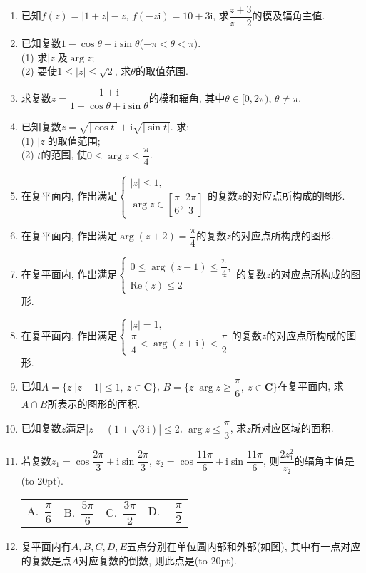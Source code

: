\documentclass[10pt,a4paper]{article}
\newcommand{\bracket}[1]{(\hbox to #1pt{})}
\newcommand{\fourch}[4]{\par\begin{tabular}{p{.23\textwidth}p{.23\textwidth}p{.23\textwidth}p{.23\textwidth}}
A.~#1 &B.~#2& C.~#3& D.~#4
\end{tabular}}
\begin{document}
\begin{enumerate}[1.]
\item 已知$f(z)=|1+z|-\overline z$, $f(-\overline z\mathrm{i})=10+3\mathrm{i}$, 求$\dfrac{z+3}{z-2}$的模及辐角主值.
\item 已知复数$1-\cos \theta +\mathrm{i}\sin \theta$($-\pi <\theta <\pi$).\\
(1) 求$|z|$及$\arg z$;\\
(2) 要使$1\le|z|\le \sqrt 2$, 求$\theta$的取值范围.
\item 求复数$z=\dfrac{1+\mathrm{i}}{1+\cos \theta +\mathrm{i}\sin \theta }$的模和辐角, 其中$\theta \in [0,2\pi)$, $\theta \ne \pi$.
\item 已知复数$z=\sqrt {|\cos t|}+\mathrm{i}\sqrt {|\sin t|}$. 求:\\
(1) $|z|$的取值范围;\\
(2) $t$的范围, 使$0\le \arg z\le \dfrac{\pi }4$.
\item 在复平面内, 作出满足$\begin{cases}|z|\le 1, \\ \arg z\in [\dfrac{\pi }6,\dfrac{2\pi }3] \end{cases}$的复数$z$的对应点所构成的图形.
\item 在复平面内, 作出满足$\arg (z+2)=\dfrac{\pi }4$的复数$z$的对应点所构成的图形.
\item 在复平面内, 作出满足$\begin{cases} 0\le \arg (z-1)\le \dfrac{\pi }4, \\ \mathrm{Re}(z)\le 2 \end{cases}$的复数$z$的对应点所构成的图形.
\item 在复平面内, 作出满足$\begin{cases}|z|=1, \\ \dfrac{\pi }4<\arg (z+\mathrm{i})<\dfrac{\pi }2 \end{cases}$的复数$z$的对应点所构成的图形.
\item 已知$A=\{z||z-1|\le 1, \ z\in \mathbf{C}\}$, $B=\{z|\arg z\ge \dfrac{\pi }6, \ z\in \mathbf{C}\}$在复平面内, 求$A\cap B$所表示的图形的面积.
\item 已知复数$z$满足$|z-(1+\sqrt 3\mathrm{i})|\le 2$, $\arg z\le \dfrac{\pi }3$, 求$z$所对应区域的面积.
\item 若复数$z_1=\cos \dfrac{2\pi }3+\mathrm{i}\sin \dfrac{2\pi }3$, $z_2=\cos \dfrac{11\pi }6+\mathrm{i}\sin \dfrac{11\pi }6$, 则$\dfrac{2z_1^2}{z_2}$的辐角主值是\bracket{20}.
\fourch{$\dfrac{\pi }6$}{$\dfrac{5\pi }6$}{$\dfrac{3\pi }2$}{$-\dfrac{\pi }2$}
\item 复平面内有$A,B,C,D,E$五点分别在单位圆内部和外部(如图), 其中有一点对应的复数是点$A$对应复数的倒数, 则此点是\bracket{20}.

\end{enumerate}
\end{document}
